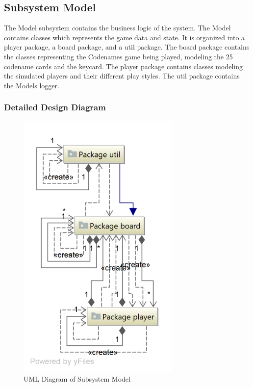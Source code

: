 \subsection{Subsystem Model}
The Model subsystem contains the business logic of the system. The Model contains classes which represents the game data and state. It is organized into a player package, a board package, and a util package. The board package contains the classes representing the Codenames game being played, modeling the 25 codename cards and the keycard. The player package contains classes modeling the simulated players and their different play styles. The util package contains the Models logger.

\subsubsection{Detailed Design Diagram}
\begin{figure}[H]
\centering
\includegraphics[width=8cm]{Source/Module/Model/Model.png}
\caption{UML Diagram of Subsystem Model}
\end{figure}



